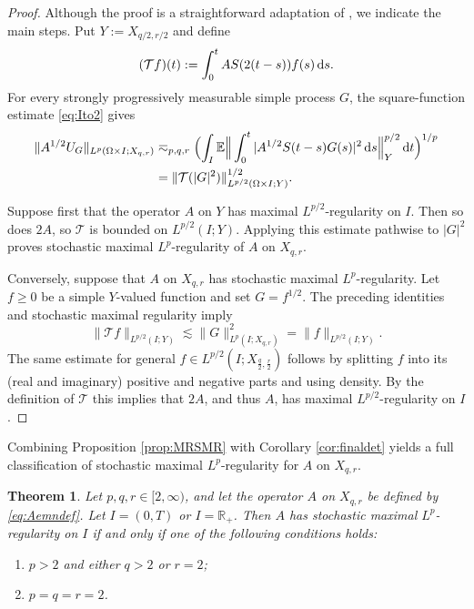 \documentclass{amsart}
\let\geq\geqslant
\theoremstyle{plain}
\newtheorem{theorem}{Theorem}[section]
\theoremstyle{remark}
\theoremstyle{plain}
\numberwithin{equation}{section}
\newcommand{\R}{\mathbb R}
\newcommand{\E}{\mathbb E}
\newcommand{\1}{\mathbf 1}
\newcommand{\dd}{\,{\rm d}}
\newcommand{\mc}{\mathcal}
\newcommand{\brB}[1]{\Bigl(#1\Bigr)}
\begin{document}
\begin{proof}
Although the proof is a straightforward adaptation of \cite{NVW-SMR}, we indicate the main steps. Put $Y:=X_{q/2,r/2}$
and define
\[
        (\mc Tf)(t)    :=    \int_0^t AS(2(t-s))f(s)\dd s.
\]
For every strongly progressively measurable simple process $G$, the
square-function estimate \eqref{eq:Ito2} gives
\begin{align*}
            \|A^{1/2}U_G\|_{L^p(\Omega\times I;X_{q,r})}&\eqsim_{p,q,r} \brB{\int_I \E\Big\| \int_0^t |A^{1/2}S(t-s)G(s)|^2\dd s  \Big\|_Y^{p/2}\dd t}^{1/p}\\&=\|\mc T(|G|^2)\|_{L^{p/2}(\Omega\times I;Y)}^{1/2}.
\end{align*}

Suppose first that the operator $A$ on $Y$ has maximal $L^{p/2}$-regularity on $I$. Then so does $2A$, so $\mc T$ is bounded on $L^{p/2}(I;Y)$. Applying this estimate pathwise to $|G|^2$ proves stochastic maximal $L^p$-regularity of $A$ on $X_{q,r}$.

Conversely, suppose that $A$ on $X_{q,r}$ has stochastic maximal $L^p$-regularity. Let $f\geq0$ be a simple $Y$-valued function and set $G=f^{1/2}$. The preceding identities and stochastic maximal regularity imply
\[
\|\mc{T}f\|_{L^{p/2}(I;Y)}\lesssim\|G\|_{L^p(I;X_{q,r})}^2=\|f\|_{L^{p/2}(I;Y)}.
\]
The same estimate  for general  $f\in L^{p/2}(I;X_{\frac{q}{2},\frac{r}{2}})$ follows by
splitting $f$ into its (real and imaginary) positive and negative parts and using density.
By the definition of $\mc{T}$ this implies that $2A$, and thus $A$, has maximal $L^{p/2}$-regularity on $I$.
\end{proof}

Combining Proposition \ref{prop:MRSMR} with Corollary
\ref{cor:finaldet} yields a full classification of stochastic maximal $L^p$-regularity for $A$ on $X_{q,r}$. 

\begin{theorem}\label{thm:mainSMR}
Let $p,q,r\in[2,\infty)$, and let the operator $A$ on $X_{q,r}$ be defined by
\eqref{eq:Aemndef}. Let $I= (0,T)$ or $I = \R_+$. Then $A$ has stochastic maximal
$L^p$-regularity on $I$ if and only if one of the following conditions
holds:
\begin{enumerate}[label={\rm(\roman*)}, leftmargin=*]
\item $p>2$ and either $q>2$ or $r=2$;
\item $p=q=r=2$.
\end{enumerate}
\end{theorem}
\end{document}
